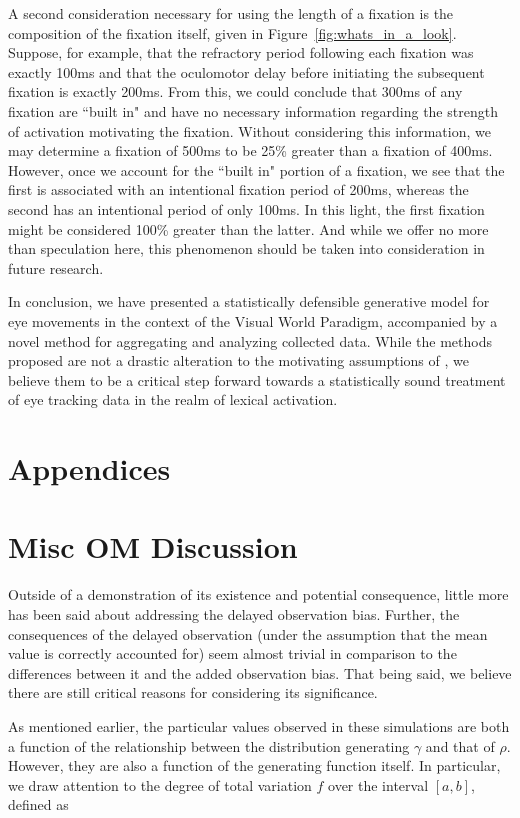 A second consideration necessary for using the length of a fixation is the composition of the fixation itself, given in Figure~\ref{fig:whats_in_a_look}. Suppose, for example, that the refractory period following each fixation was exactly 100ms and that the oculomotor delay before initiating the subsequent fixation is exactly 200ms. From this, we could conclude that 300ms of any fixation are ``built in" and have no necessary information regarding the strength of activation motivating the fixation. Without considering this information, we may determine a fixation of 500ms to be 25\% greater than a fixation of 400ms. However, once we account for the ``built in" portion of a fixation, we see that the first is associated with an intentional fixation period of 200ms, whereas the second has an intentional period of only 100ms. In this light, the first fixation might be considered 100\% greater than the latter. And while we offer no more than speculation here, this phenomenon should be taken into consideration in future research.

In conclusion, we have presented a statistically defensible generative model for eye movements in the context of the Visual World Paradigm, accompanied by a novel method for aggregating and analyzing collected data. While the methods proposed are not a drastic alteration to the motivating assumptions of \citet{allopenna1998tracking}, we believe them to be a critical step forward towards a statistically sound treatment of eye tracking data in the realm of lexical activation.




\section*{Appendices}


\section{Misc OM Discussion}


Outside of a demonstration of its existence and potential consequence, little more has been said about addressing the delayed observation bias. Further, the consequences of the delayed observation (under the assumption that the mean value is correctly accounted for) seem almost trivial in comparison to the differences between it and the added observation bias. That being said, we believe there are still critical reasons for considering its significance.

As mentioned earlier, the particular values observed in these simulations are both a function of the relationship between the distribution generating $\gamma$ and that of $\rho$. However, they are also a function of the generating function itself. In particular, we draw attention to the degree of total variation $f$ over the interval $[a,b]$, defined as 

